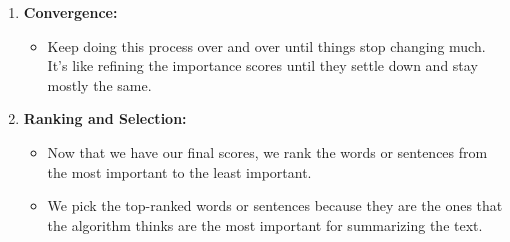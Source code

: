 \documentclass{ieeeaccess}
\begin{document}
\begin{enumerate}
    \item \textbf{Convergence:}
    \begin{itemize}
        \item Keep doing this process over and over until things stop changing much. It's like refining the importance scores until they settle down and stay mostly the same.
    \end{itemize}
    
    \item \textbf{Ranking and Selection:}
    \begin{itemize}
        \item Now that we have our final scores, we rank the words or sentences from the most important to the least important.
        \item We pick the top-ranked words or sentences because they are the ones that the algorithm thinks are the most important for summarizing the text.
    \end{itemize}
\end{enumerate}
\end{document}

